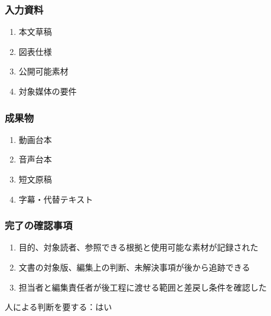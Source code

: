 \documentclass[a4paper,11pt]{article}
\begin{document}
\subsubsection*{入力資料}
\begin{enumerate}[leftmargin=2em,itemsep=0.35em]
\item 本文草稿
\item 図表仕様
\item 公開可能素材
\item 対象媒体の要件
\end{enumerate}
\subsubsection*{成果物}
\begin{enumerate}[leftmargin=2em,itemsep=0.35em]
\item 動画台本
\item 音声台本
\item 短文原稿
\item 字幕・代替テキスト
\end{enumerate}
\subsubsection*{完了の確認事項}
\begin{enumerate}[leftmargin=2em,itemsep=0.35em]
\item 目的、対象読者、参照できる根拠と使用可能な素材が記録された
\item 文書の対象版、編集上の判断、未解決事項が後から追跡できる
\item 担当者と編集責任者が後工程に渡せる範囲と差戻し条件を確認した
\end{enumerate}
\par 人による判断を要する：はい\par\medskip
\end{document}
